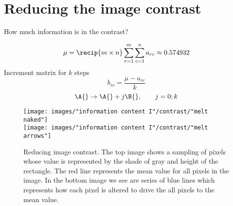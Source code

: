 \clearpage
\section{Reducing the image contrast}
How much information is in the contrast?

%
\begin{equation}
  \mu = \recip{m \times n} \sum_{r=1}^{m} \sum_{c=1}^{n} a_{rc} \approx 0.574932
\end{equation}
%
Increment matrix for $k$ steps
%
\begin{equation}
  b_{rc} = \frac{\mu - a_{rc}} {k}
\end{equation}
%
\begin{equation}
  \A{} \to \A{} + j \B{}, \qquad j=0;k
\end{equation}
\begin{figure}[htbp] %
   \centering
   \texttt{[image: images/"information content I"/contrast/"melt naked"]} \\[10pt]
   \texttt{[image: images/"information content I"/contrast/"melt arrows"]} 
   \caption[Reducing image contrast]{Reducing image contrast. The top image shows a sampling of pixels whose value is represented by the shade of gray and height of the rectangle. The red line represents the mean value for all pixels in the image. In the bottom image we see are series of blue lines which represents how each pixel is altered to drive the all pixels to the mean value.}
   \label{fig:contrast:increments}
\end{figure}


